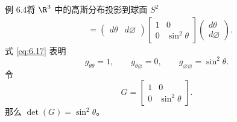 \begin{statement}{例 6.4}{将 $\R^3$ 中的高斯分布投影到球面 $S^2$}
\begin{equation*}
\begin{aligned}
     &=\begin{pmatrix}d\theta&d\varnothing\end{pmatrix}
       \begin{bmatrix}1&0\\0&\sin^2\theta\end{bmatrix}
       \begin{pmatrix}d\theta\\d\varnothing\end{pmatrix}.
  \end{aligned}
  \tag{6.17}\label{eq:6.17}
\end{equation*}
式 \eqref{eq:6.17} 表明
\[
  g_{\theta\theta}=1,\qquad g_{\theta\varnothing}=0,\qquad
  g_{\varnothing\varnothing}=\sin^2\theta.
\]
令
\[
  G=\begin{bmatrix}1&0\\0&\sin^2\theta\end{bmatrix}.
\]
那么 $\det(G)=\sin^2\theta$。


\end{statement}
